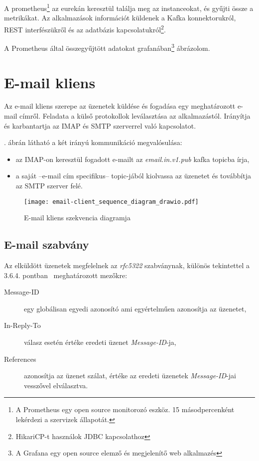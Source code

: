 A prometheus\footnote{A Prometheus egy open source monitorozó eszköz. 15 másodpercenként lekérdezi a szervizek állapotát.} az eurekán keresztül találja meg az instanceokat, és gyűjti össze a metrikákat. Az alkalmazások információt küldenek a Kafka konnektorukról, REST interfészükről és az adatbázis kapcsolatukról\footnote{HikariCP-t használok JDBC kapcsolathoz}.

A Prometheus által összegyűjtött adatokat grafanában\footnote{A Grafana egy open source elemző és megjelenítő web alkalmazés} ábrázolom.






\section{E-mail kliens}
Az e-mail kliens szerepe az üzenetek küldése és fogadása egy meghatározott e-mail címről. Feladata a külső protokollok leválasztása az alkalmazástól. Irányítja és karbantartja az IMAP és SMTP szerverrel való kapcsolatot.

. ábrán látható a két irányú kommunikáció megvalósulása:
\begin{itemize}
	\item az IMAP-on keresztül fogadott e-mailt az \textit{email.in.v1.pub} kafka topicba írja,
	\item a saját --e-mail cím specifikus-- topic-jából kiolvassa az üzenetet és továbbítja  az SMTP szerver felé.
\end{itemize}


\begin{figure}[hbt] 
	\centering
	\texttt{[image: email-client\_sequence\_diagram\_drawio.pdf]}
	\caption{E-mail kliens szekvencia diagramja}
	\label{fig:email-client_sequence_diagram}
\end{figure}




\subsection{E-mail szabvány}
Az elküldött üzenetek megfelelnek az \textit{rfc5322} szabványnak, különös tekintettel a 3.6.4. pontban~\cite{rfc5322_Identification_Fields} meghatározott mezőkre:

\begin{description}
	\item[Message-ID] egy globálisan egyedi azonosító ami egyértelműen azonosítja az üzenetet,
	
	\item[In-Reply-To] válasz esetén értéke eredeti üzenet \textit{Message-ID}-ja,
	
	\item[References] azonosítja az üzenet szálat, értéke az eredeti üzenetek \textit{Message-ID}-jai vesszővel elválasztva.
\end{description}


